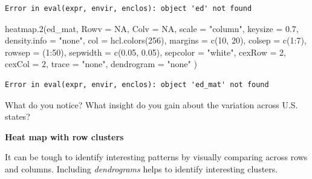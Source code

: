 \documentclass[
  letterpaper,
  DIV=11,
  numbers=noendperiod]{scrreprt}
\newenvironment{Shaded}{\begin{snugshade}}{\end{snugshade}}
\newcommand{\AttributeTok}[1]{\textcolor[rgb]{0.40,0.45,0.13}{#1}}
\newcommand{\ConstantTok}[1]{\textcolor[rgb]{0.56,0.35,0.01}{#1}}
\newcommand{\DecValTok}[1]{\textcolor[rgb]{0.68,0.00,0.00}{#1}}
\newcommand{\FloatTok}[1]{\textcolor[rgb]{0.68,0.00,0.00}{#1}}
\newcommand{\FunctionTok}[1]{\textcolor[rgb]{0.28,0.35,0.67}{#1}}
\newcommand{\NormalTok}[1]{\textcolor[rgb]{0.00,0.23,0.31}{#1}}
\newcommand{\SpecialCharTok}[1]{\textcolor[rgb]{0.37,0.37,0.37}{#1}}
\newcommand{\StringTok}[1]{\textcolor[rgb]{0.13,0.47,0.30}{#1}}
\begin{document}
\begin{verbatim}
Error in eval(expr, envir, enclos): object 'ed' not found
\end{verbatim}

\begin{Shaded}
\begin{Highlighting}[]
\FunctionTok{heatmap.2}\NormalTok{(ed\_mat,}
  \AttributeTok{Rowv =} \ConstantTok{NA}\NormalTok{, }\AttributeTok{Colv =} \ConstantTok{NA}\NormalTok{, }\AttributeTok{scale =} \StringTok{"column"}\NormalTok{,}
  \AttributeTok{keysize =} \FloatTok{0.7}\NormalTok{, }\AttributeTok{density.info =} \StringTok{"none"}\NormalTok{,}
  \AttributeTok{col =} \FunctionTok{hcl.colors}\NormalTok{(}\DecValTok{256}\NormalTok{), }\AttributeTok{margins =} \FunctionTok{c}\NormalTok{(}\DecValTok{10}\NormalTok{, }\DecValTok{20}\NormalTok{),}
  \AttributeTok{colsep =} \FunctionTok{c}\NormalTok{(}\DecValTok{1}\SpecialCharTok{:}\DecValTok{7}\NormalTok{), }\AttributeTok{rowsep =}\NormalTok{ (}\DecValTok{1}\SpecialCharTok{:}\DecValTok{50}\NormalTok{), }\AttributeTok{sepwidth =} \FunctionTok{c}\NormalTok{(}\FloatTok{0.05}\NormalTok{, }\FloatTok{0.05}\NormalTok{),}
  \AttributeTok{sepcolor =} \StringTok{"white"}\NormalTok{, }\AttributeTok{cexRow =} \DecValTok{2}\NormalTok{, }\AttributeTok{cexCol =} \DecValTok{2}\NormalTok{, }\AttributeTok{trace =} \StringTok{"none"}\NormalTok{,}
  \AttributeTok{dendrogram =} \StringTok{"none"}
\NormalTok{)}
\end{Highlighting}
\end{Shaded}

\begin{verbatim}
Error in eval(expr, envir, enclos): object 'ed_mat' not found
\end{verbatim}

\begin{Shaded}
\begin{Highlighting}[]
\NormalTok{What do you notice? What insight do you gain about the variation across U.S. states?}
\end{Highlighting}
\end{Shaded}

\textbf{Heat map with row clusters}

It can be tough to identify interesting patterns by visually comparing
across rows and columns. Including \emph{dendrograms} helps to identify
interesting clusters.
\end{document}
